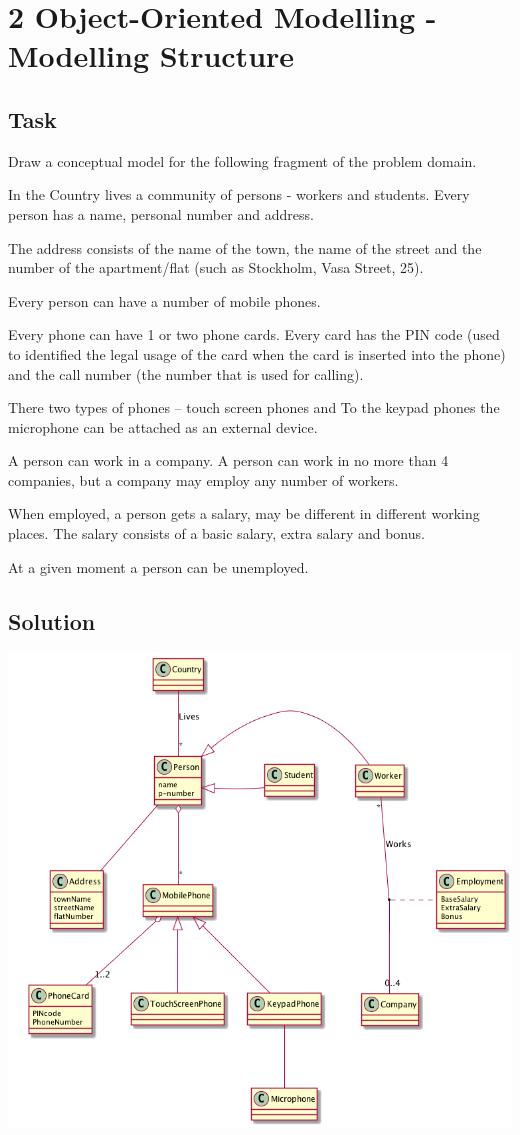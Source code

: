 \documentclass[11pt]{article}
\author{Mikael Svahnberg}
\date{\today}
\title{}
\begin{document}
\tableofcontents

\section{2 Object-Oriented Modelling - Modelling Structure}
\label{sec:orgheadline3}
\subsection{Task}
\label{sec:orgheadline1}
Draw a conceptual model for the following fragment of the problem domain.

In the Country lives a community of persons - workers and students.
Every person has a name, personal number and address.

The address consists of the name of the town, the name of the street and the number of the
apartment/flat (such as Stockholm, Vasa Street, 25).

Every person can have a number of mobile phones.

Every phone can have 1 or two phone cards. Every card has the PIN code (used to identified the
legal usage of the card when the card is inserted into the phone) and the call number (the number
that is used for calling).

There two types of phones – touch screen phones and
To the keypad phones the microphone can be attached as an external device.

A person can work in a company. A person can work in no more than 4 companies, but a company
may employ any number of workers.

When employed, a person gets a salary, may be different in different working places.
The salary consists of a basic salary, extra salary and bonus.

At a given moment a person can be unemployed.

\subsection{Solution}
\label{sec:orgheadline2}
\includegraphics[width=.9\linewidth]{FConceptual-20160109_SOLVED.png}
\end{document}
